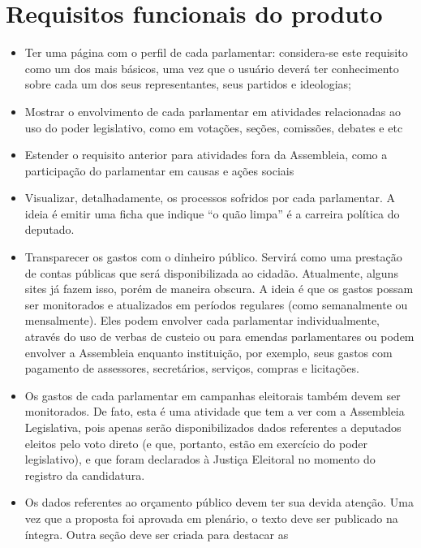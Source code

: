 \documentclass[12pt, a4paper]{article}
\begin{document}
    \section{Requisitos funcionais do produto}
    \begin{itemize}
    \item Ter uma página com o perfil de cada parlamentar: considera-se este
        requisito como um dos mais básicos, uma vez que o usuário deverá ter
        conhecimento sobre cada um dos seus representantes, seus partidos e
        ideologias;
    \item Mostrar o envolvimento de cada parlamentar em atividades relacionadas
        ao uso do poder legislativo, como em votações, seções, comissões,
        debates e etc
    \item Estender o requisito anterior para atividades fora da Assembleia,
        como a participação do parlamentar em causas e ações sociais
    \item Visualizar, detalhadamente, os processos sofridos por cada parlamentar. A ideia é emitir uma ficha que indique “o quão limpa” é a carreira política do deputado.
    \item Transparecer os gastos com o dinheiro público. Servirá como uma
        prestação de contas públicas que será disponibilizada ao cidadão.
        Atualmente, alguns sites já fazem isso, porém de maneira obscura. A
        ideia é que os gastos possam ser monitorados e atualizados em períodos
        regulares (como semanalmente ou mensalmente). Eles podem envolver cada
        parlamentar individualmente, através do uso de verbas de custeio ou
        para emendas parlamentares ou podem envolver a Assembleia enquanto
        instituição, por exemplo, seus gastos com pagamento de assessores,
        secretários, serviços, compras e licitações.
    \item Os gastos de cada parlamentar em campanhas eleitorais também devem
        ser monitorados. De fato, esta é uma atividade que tem a ver com a
        Assembleia Legislativa, pois apenas serão disponibilizados dados
        referentes a deputados eleitos pelo voto direto (e que, portanto, estão
        em exercício do poder legislativo), e que foram declarados à Justiça
        Eleitoral no momento do registro da candidatura.
    \item Os dados referentes ao orçamento público devem ter sua devida
        atenção. Uma vez que a proposta foi aprovada em plenário, o texto deve
        ser publicado na íntegra. Outra seção deve ser criada para destacar as

\end{itemize}
\end{document}
